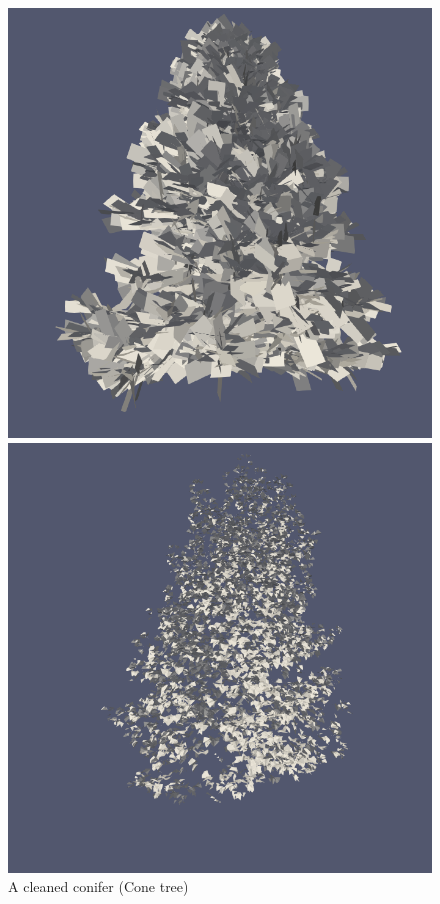 \documentclass[12pt]{article}
\begin{document}
\begin{figure}[H]
    \centering
    \begin{minipage}{0.30\textwidth}
        \centering
        \includegraphics[width=1\textwidth]{images/tree-conifer.png}
        \caption{A cleaned conifer (Cone tree)}
    \end{minipage}
    \begin{minipage}{0.30\textwidth}
        \centering
        \includegraphics[width=1\textwidth]{images/tree-ginkgo.png}

\end{minipage}
\end{figure}
\end{document}
